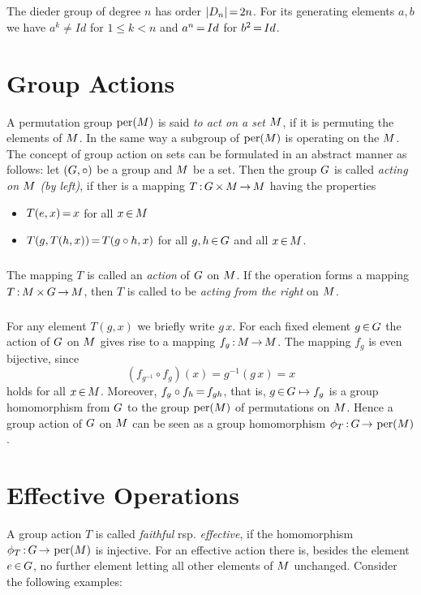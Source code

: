 \documentclass[11pt,twoside]{article}
\begin{document}
\subparagraph{}
The dieder group of degree $n$ has order $\abs{D_n} \eq 2n$.
For its generating elements $a,b$ we have $a^k \neq Id$ for $1 \leq k < n$
and $a^n {\,=\,} Id$ for $b^2 {\,=\,} Id$.

\section{Group Actions}
A permutation group $\operatorname{per}(M)$ is said
\textit{to act on a set $M$},
if it is permuting the elements of $M$.
In the same way a subgroup of $\operatorname{per}(M)$ is operating
on the $M$.
The concept of group action on sets can be formulated
in an abstract manner as follows:
let $(G,\circ)$ be a group and $M$ be a set.
Then the group $G$ is called \textit{acting on $M$
(by left)},
if ther is a mapping $T {\,:\,} G {\,\times\,} M {\,\to\,} M$
having the properties

\begin{itemize}[leftmargin=15pt]
\item[1.]
$T(e,x) {\,=\,} x$ for all $x {\,\in\,} M$

\item[2.]
$T(g,T(h,x)) {\,=\,} T(g \circ h, x)$
for all $g,h {\,\in\,} G$ and all $x {\,\in\,} M$.
\end{itemize}

\subparagraph{}
The mapping $T$ is called an \textit{action} of $G$ on $M$.
If the operation forms a mapping $T {\,:\,} M {\,\times\,} G {\,\to\,} M$,
then $T$ is called to be \textit{acting from the right} on $M$.

\subparagraph{}
For any element $T(g,x)$ we briefly write $g \, x$.
For each fixed element $g {\,\in\,} G$ the action of $G$ on $M$
gives rise to a mapping $f_g {\,:\,} M {\,\to\,} M$.
The mapping $f_g$ is even bijective,
since
\[
(f_{g^{-1}} \circ f_g)(x) = g^{-1}(g\,x) = x
\]
holds for all $x {\,\in\,} M$.
Moreover,
$f_g \circ f_h {\,=\,} f_{gh}$,
that is,
$g {\,\in\,} G \mapsto f_g$ is a group homomorphism from $G$
to the group $\operatorname{per}(M)$ of permutations on $M$.
Hence a group action of $G$ on $M$ can be seen
as a group homomorphism $\phi_T {\,:\,} G {\,\to\,} \operatorname{per}(M)$.

\section{Effective Operations}
A group action $T$ is called \textit{faithful} rsp. \textit{effective},
if the homomorphism $\phi_T {\,:\,} G {\,\to\,} \operatorname{per}(M)$
is injective.
For an effective action there is,
besides the element $e {\,\in\,} G$,
no further element letting all other elements of $M$ unchanged.
Consider the following examples:
\end{document}
